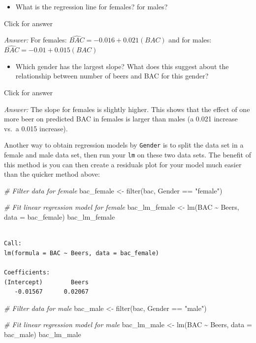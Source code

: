 \documentclass[
]{book}
\newenvironment{Shaded}{\begin{snugshade}}{\end{snugshade}}
\newcommand{\AttributeTok}[1]{\textcolor[rgb]{0.77,0.63,0.00}{#1}}
\newcommand{\CommentTok}[1]{\textcolor[rgb]{0.56,0.35,0.01}{\textit{#1}}}
\newcommand{\FunctionTok}[1]{\textcolor[rgb]{0.00,0.00,0.00}{#1}}
\newcommand{\NormalTok}[1]{#1}
\newcommand{\OtherTok}[1]{\textcolor[rgb]{0.56,0.35,0.01}{#1}}
\newcommand{\SpecialCharTok}[1]{\textcolor[rgb]{0.00,0.00,0.00}{#1}}
\newcommand{\StringTok}[1]{\textcolor[rgb]{0.31,0.60,0.02}{#1}}
\providecommand{\tightlist}{%
  \setlength{\itemsep}{0pt}\setlength{\parskip}{0pt}}
\begin{document}
\begin{itemize}
\tightlist
\item
  What is the regression line for females? for males?
\end{itemize}

Click for answer

\emph{Answer:} For females: \(\widehat{BAC} = -0.016 +0.021(BAC)\) and for males: \(\widehat{BAC} = -0.01 +0.015(BAC)\)

\begin{itemize}
\tightlist
\item
  Which gender has the largest slope? What does this suggest about the relationship between number of beers and BAC for this gender?
\end{itemize}

Click for answer

\emph{Answer:} The slope for females is slightly higher. This shows that the effect of one more beer on predicted BAC in females is larger than males (a 0.021 increase vs.~a 0.015 increase).

Another way to obtain regression models by \texttt{Gender} is to split the data set in a female and male data set, then run your \texttt{lm} on these two data sets. The benefit of this method is you can then create a residuals plot for your model much easier than the quicker method above:

\begin{Shaded}
\begin{Highlighting}[]
\CommentTok{\# Filter data for female}
\NormalTok{bac\_female }\OtherTok{\textless{}{-}} \FunctionTok{filter}\NormalTok{(bac, Gender }\SpecialCharTok{==} \StringTok{"female"}\NormalTok{)}

\CommentTok{\# Fit linear regression model for female}
\NormalTok{bac\_lm\_female }\OtherTok{\textless{}{-}} \FunctionTok{lm}\NormalTok{(BAC }\SpecialCharTok{\textasciitilde{}}\NormalTok{ Beers, }\AttributeTok{data =}\NormalTok{ bac\_female)}
\NormalTok{bac\_lm\_female}
\end{Highlighting}
\end{Shaded}

\begin{verbatim}

Call:
lm(formula = BAC ~ Beers, data = bac_female)

Coefficients:
(Intercept)        Beers  
   -0.01567      0.02067  
\end{verbatim}

\begin{Shaded}
\begin{Highlighting}[]
\CommentTok{\# Filter data for male}
\NormalTok{bac\_male }\OtherTok{\textless{}{-}} \FunctionTok{filter}\NormalTok{(bac, Gender }\SpecialCharTok{==} \StringTok{"male"}\NormalTok{)}

\CommentTok{\# Fit linear regression model for male}
\NormalTok{bac\_lm\_male }\OtherTok{\textless{}{-}} \FunctionTok{lm}\NormalTok{(BAC }\SpecialCharTok{\textasciitilde{}}\NormalTok{ Beers, }\AttributeTok{data =}\NormalTok{ bac\_male)}
\NormalTok{bac\_lm\_male}
\end{Highlighting}
\end{Shaded}
\end{document}
